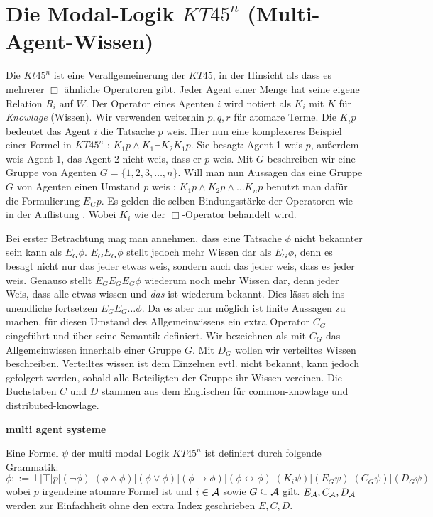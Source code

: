 
\section{Die Modal-Logik $KT45^n$ (Multi-Agent-Wissen)} %
\label{sub:the_modal_logic_kt45_n_}

Die \MML $Kt45^n$ ist eine Verallgemeinerung der \ML $KT45$, in der Hinsicht als dass es mehrerer $\Box$ ähnliche Operatoren gibt.
Jeder Agent einer Menge \AgentSetDef hat seine eigene Relation $R_i$ auf $W$.
Der Operator eines Agenten $i$ wird notiert als $K_i$ mit $K$ für \emph{Knowlage} (Wissen).
Wir verwenden weiterhin $p,q,r$ für atomare Terme.
Die $K_ip$ bedeutet das Agent $i$ die Tatsache $p$ weis.
Hier nun eine komplexeres Beispiel einer Formel in $KT45^n$ : $K_1p \wedge K_1 \neg K_2 K_1 p$.
Sie besagt: Agent 1 weis $p$, außerdem weis Agent 1, das Agent 2 nicht weis, dass er $p$ weis.
Mit $G$ beschreiben wir eine Gruppe von Agenten $G= \{1,2,3,\dots,n\}$.
Will man nun Aussagen das eine Gruppe $G$ von Agenten einen Umstand $p$ weis : $K_1 p \wedge K_2 p \wedge \dots K_n p$ benutzt man dafür die Formulierung $E_G p$.
Es gelden die selben Bindungsstärke der Operatoren wie in der Auflistung .
Wobei $K_i$ wie der $\Box$-Operator behandelt wird.


Bei erster Betrachtung mag man annehmen, dass eine Tatsache $\phi$ nicht bekannter sein kann als $E_G \phi$.
$E_G E_G \phi$ stellt jedoch mehr Wissen dar als $E_G \phi$, denn es besagt nicht nur das jeder etwas weis, sondern auch das jeder weis, dass es jeder weis.
Genauso stellt $E_G E_G E_G \phi$ wiederum noch mehr Wissen dar, denn jeder Weis, dass alle etwas wissen und \emph{das} ist wiederum bekannt.
Dies lässt sich ins unendliche fortsetzen $E_G E_G \dots \phi$.
Da es aber nur möglich ist finite Aussagen zu machen, für diesen Umstand des Allgemeinwissens ein extra Operator $C_G$ eingeführt und über seine Semantik definiert.
Wir bezeichnen als mit $C_G$ das Allgemeinwissen innerhalb einer Gruppe $G$.
Mit $D_G$ wollen wir verteiltes Wissen beschreiben.
Verteiltes wissen ist dem Einzelnen evtl. nicht bekannt, kann jedoch gefolgert werden, sobald alle Beteiligten der Gruppe ihr Wissen vereinen.
Die Buchstaben $C$ und $D$ stammen aus dem Englischen für common-knowlage und distributed-knowlage.

\textbf{multi agent systeme}
\begin{definition}
	\label{def:bnf_kt45n}
	Eine Formel $\psi$ der multi modal Logik $KT45^n$ ist definiert durch folgende Grammatik:
	\begin{equation}
		\label{eqn:bnf_kt45n}
		\phi ::= \bot|\top|p|(\neg\phi)|(\phi\wedge\phi)|(\phi\vee\phi)|(\phi\rightarrow\phi)|
		(\phi\leftrightarrow\phi)|(K_i\psi)|(E_G\psi)|(C_G\psi)|(D_G\psi)
	\end{equation}
	wobei $p$ irgendeine atomare Formel ist und $i \in \mathcal{A}$ sowie $G \subseteq \mathcal{A}$ gilt.
	$E_{\mathcal{A}}, C_{\mathcal{A}}, D_{\mathcal{A}}$ werden zur Einfachheit ohne den extra Index geschrieben $E,C,D$.
\end{definition}


